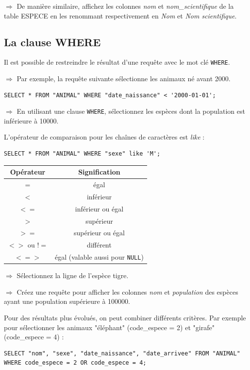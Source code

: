 \documentclass[11pt]{article}
\newcommand{\action}{$\Rightarrow$ }
\begin{document}
\action De manière similaire, affichez les colonnes \textit{nom} et \textit{nom\_scientifique} de la table ESPECE en les renommant respectivement en \textit{Nom} et \textit{Nom scientifique}.


\subsection{La clause WHERE}
Il est possible de restreindre le résultat d'une requête avec le mot clé \lstinline{WHERE}.

\action Par exemple, la requête suivante sélectionne les animaux né avant 2000.
\begin{lstlisting}
SELECT * FROM "ANIMAL" WHERE "date_naissance" < '2000-01-01';
\end{lstlisting}

\action En utilisant une clause \lstinline{WHERE}, sélectionnez les espèces dont la population est inférieure à 10000.

L'opérateur de comparaison pour les chaînes de caractères est \textit{like} :

\begin{lstlisting}
SELECT * FROM "ANIMAL" WHERE "sexe" like 'M';
\end{lstlisting}

\begin{center}
	\begin{tabular}{c|c}
		\textbf{Opérateur} & \textbf{Signification} \\
		\hline
		$=$ & égal \\
		$<$ & inférieur \\
		$<=$ & inférieur ou égal \\
		$>$ & supérieur \\
		$>=$ & supérieur ou égal \\
		$<>$ ou $!=$ & différent \\
		$<=>$ & égal (valable aussi pour \lstinline{NULL}) \\
	\end{tabular}
\end{center}

\action Sélectionnez la ligne de l'espèce tigre.

\action Créez une requête pour afficher les colonnes \textit{nom} et \textit{population} des espèces ayant une population supérieure à 100000.


Pour des résultats plus évolués, on peut combiner différents critères. Par exemple pour sélectionner les animaux "éléphant" (code\_espece = 2) et "girafe" (code\_espece = 4) :
\begin{lstlisting}
SELECT "nom", "sexe", "date_naissance", "date_arrivee" FROM "ANIMAL" WHERE code_espece = 2 OR code_espece = 4;
\end{lstlisting}
\end{document}
